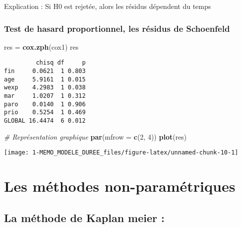 \documentclass[
]{article}
\newenvironment{Shaded}{\begin{snugshade}}{\end{snugshade}}
\newcommand{\AttributeTok}[1]{\textcolor[rgb]{0.13,0.29,0.53}{#1}}
\newcommand{\CommentTok}[1]{\textcolor[rgb]{0.56,0.35,0.01}{\textit{#1}}}
\newcommand{\DecValTok}[1]{\textcolor[rgb]{0.00,0.00,0.81}{#1}}
\newcommand{\FunctionTok}[1]{\textcolor[rgb]{0.13,0.29,0.53}{\textbf{#1}}}
\newcommand{\NormalTok}[1]{#1}
\newcommand{\OtherTok}[1]{\textcolor[rgb]{0.56,0.35,0.01}{#1}}
\begin{document}
Explication : Si H0 est rejetée, alors les résidus dépendent du temps

\hypertarget{test-de-hasard-proportionnel-les-ruxe9sidus-de-schoenfeld}{%
\subsubsection{Test de hasard proportionnel, les résidus de
Schoenfeld}\label{test-de-hasard-proportionnel-les-ruxe9sidus-de-schoenfeld}}

\begin{Shaded}
\begin{Highlighting}[]
\NormalTok{res }\OtherTok{=} \FunctionTok{cox.zph}\NormalTok{(cox1)}
\NormalTok{res}
\end{Highlighting}
\end{Shaded}

\begin{verbatim}
         chisq df     p
fin     0.0621  1 0.803
age     5.9161  1 0.015
wexp    4.2983  1 0.038
mar     1.0207  1 0.312
paro    0.0140  1 0.906
prio    0.5254  1 0.469
GLOBAL 16.4474  6 0.012
\end{verbatim}

\begin{Shaded}
\begin{Highlighting}[]
\CommentTok{\# Représentation graphique}
\FunctionTok{par}\NormalTok{(}\AttributeTok{mfrow =} \FunctionTok{c}\NormalTok{(}\DecValTok{2}\NormalTok{, }\DecValTok{4}\NormalTok{))}
\FunctionTok{plot}\NormalTok{(res)}
\end{Highlighting}
\end{Shaded}

\begin{center}\texttt{[image: 1-MEMO\_MODELE\_DUREE\_files/figure-latex/unnamed-chunk-10-1]} \end{center}

\hypertarget{les-muxe9thodes-non-paramuxe9triques}{%
\section{Les méthodes
non-paramétriques}\label{les-muxe9thodes-non-paramuxe9triques}}

\hypertarget{la-muxe9thode-de-kaplan-meier}{%
\subsection{La méthode de Kaplan meier
:}\label{la-muxe9thode-de-kaplan-meier}}
\end{document}
